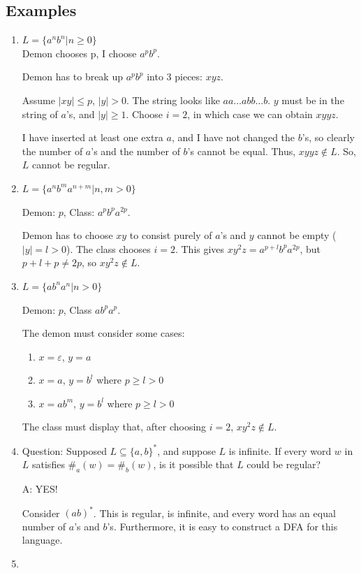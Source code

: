\documentclass{article}
\begin{document}
\subsection{Examples}
\begin{enumerate}
    \item $L = \{a^nb^n | n \geq 0\}$\\
    Demon chooses p, I choose $a^pb^p$.
    
    Demon has to break up $a^pb^p$ into 3 pieces: $xyz$.
    
    Assume $|xy| \leq p$, $|y| > 0$. The string looks like $aa\ldots abb \ldots b$. $y$ must be in the string of $a$'s, and $|y| \geq 1$. Choose $i=2$, in which case we can obtain $xyyz$.
    
    I have inserted at least one extra $a$, and I have not changed the $b$'s, so clearly the number of $a$'s and the number of $b$'s cannot be equal. Thus, $xyyz \notin L$. So, $L$ cannot be regular.
    \item $L = \{a^nb^ma^{n+m} | n,m > 0\}$
    
    Demon: $p$, Class: $a^pb^pa^{2p}$.
    
    Demon has to choose $xy$ to consist purely of $a$'s and $y$ cannot be empty ($|y| = l > 0$). The class chooses $i=2$. This gives $xy^2z = a^{p+l}b^pa^{2p}$, but $p+l+p \ne 2p$, so $xy^2z \notin L$.
    \item $L = \{ab^na^n | n > 0\}$
    
    Demon: $p$, Class $ab^pa^p$.
    
    The demon must consider some cases:
    \begin{enumerate}
        \item $x = \varepsilon$, $y = a$
        \item $x = a$, $y = b^l$ where $p \geq l > 0$
        \item $x = ab^m$, $y = b^l$ where $p \geq l > 0$
    \end{enumerate}
    The class must display that, after choosing $i=2$, $xy^2z \notin L$.
    \item Question: Supposed $L \subseteq \{a,b\}^*$, and suppose $L$ is infinite. If every word $w$ in $L$ satisfies $\#_a(w) = \#_b(w)$, is it possible that $L$ could be regular?
    
    A: YES!
    
    Consider $(ab)^*$. This is regular, is infinite, and every word has an equal number of $a$'s and $b$'s. Furthermore, it is easy to construct a DFA for this language.
    \item 
\end{enumerate}
\end{document}
